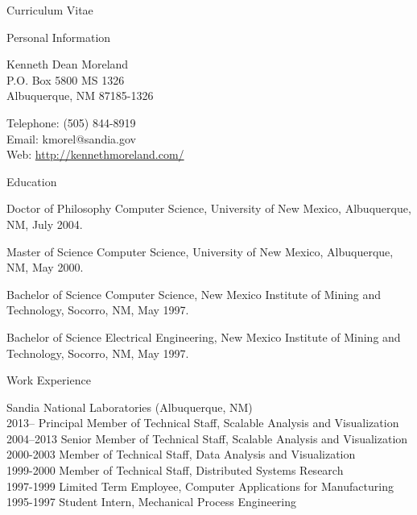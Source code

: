 \documentclass{article}
\date{August 31, 2020}
\begin{document}
  \raggedright

  \begin{cv}{Curriculum Vitae}
    \setlength{\cvlabelwidth}{.25in}
    \renewcommand*{\cvlabelfont}{\textsf}

    \begin{cvlist}{Personal Information}
      \item Kenneth Dean Moreland \\
        P.O. Box 5800  MS 1326 \\
        Albuquerque, NM  87185-1326
      \item Telephone: (505) 844-8919 \\
        Email: kmorel@sandia.gov \\
        Web: \url{http://kennethmoreland.com/}
    \end{cvlist}

    \begin{cvlist}{Education}
      \item[Doctor of Philosophy] Computer Science, University of New
        Mexico, Albuquerque, NM, July 2004.
      \item[Master of Science] Computer Science, University of New Mexico,
        Albuquerque, NM, May 2000.
      \item[Bachelor of Science] Computer Science, New Mexico Institute of
        Mining and Technology, Socorro, NM, May 1997.
      \item[Bachelor of Science] Electrical Engineering, New Mexico
        Institute of Mining and Technology, Socorro, NM, May 1997.
    \end{cvlist}

    \begin{cvlist}{Work Experience}
    \item[Sandia National Laboratories (Albuquerque, NM)]\hfill\\
      2013-- Principal Member of Technical Staff, Scalable Analysis and Visualization\\
      2004--2013 Senior Member of Technical Staff, Scalable Analysis and Visualization\\
      2000-2003 Member of Technical Staff, Data Analysis and Visualization\\
      1999-2000 Member of Technical Staff, Distributed Systems Research\\
      1997-1999 Limited Term Employee, Computer Applications for Manufacturing\\
      1995-1997 Student Intern, Mechanical Process Engineering\\
    \end{cvlist}


\end{cv}
\end{document}
